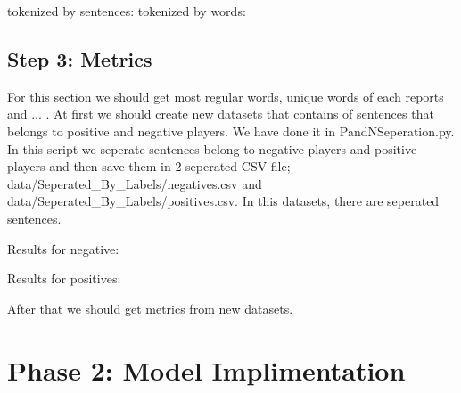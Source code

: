 \documentclass{article}
\begin{document}
tokenized by sentences:
tokenized by words:


\subsection{Step 3: Metrics}
For this section we should get most regular words, unique words of each reports and ... . At first we should create new datasets that contains of 
sentences that belongs to positive and negative players. We have done it in PandNSeperation.py. In this script we seperate sentences belong to negative players 
and positive players and then save them in 2 seperated CSV file; data/Seperated_By_Labels/negatives.csv and data/Seperated_By_Labels/positives.csv.
In this datasets, there are seperated sentences. 

Results for negative:

Results for positives:


After that we should get metrics from new datasets. 
\section{Phase 2: Model Implimentation}
\end{document}
